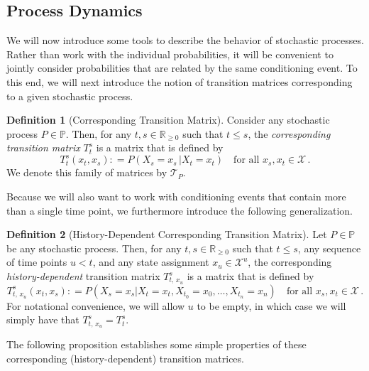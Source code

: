\documentclass[10pt]{paper}
\theoremstyle{definition}
\newtheorem{definition}{Definition}
\newcommand{\reals}{\mathbb{R}}
\newcommand{\realsnonneg}{\reals_{\geq 0}}
\newcommand{\states}{\mathcal{X}}
\newcommand{\processes}{\mathbb{P}}
\newcommand{\coloneqq}{:\!=}
\begin{document}
\subsection{Process Dynamics}\label{sec:dynamics}

We will now introduce some tools to describe the behavior of stochastic processes. Rather than work with the individual probabilities, it will be convenient to jointly consider probabilities that are related by the same conditioning event. To this end, we will next introduce the notion of transition matrices corresponding to a given stochastic process.

\begin{definition}[Corresponding Transition Matrix]\label{def:trans_matrix}
Consider any stochastic process $P\in\processes$. Then, for any $t,s\in\realsnonneg$ such that $t\leq s$, the \emph{corresponding transition matrix} $T_t^s$ is a matrix that is defined by
\begin{equation*}
T_t^s(x_t, x_s) \coloneqq P(X_s=x_s\,\vert X_t=x_t)\quad\text{for all $x_s,x_t\in\states$}\,.
\end{equation*}
We denote this family of matrices by $\mathcal{T}_P$.%
\end{definition}

Because we will also want to work with conditioning events that contain more than a single time point, we furthermore introduce the following generalization.

\begin{definition}[History-Dependent Corresponding Transition Matrix]
Let $P\in\processes$ be any stochastic process. Then, for any $t,s\in\realsnonneg$ such that $t\leq s$, any sequence of time points $u<t$, and any state assignment $x_u\in\states^u$, the corresponding \emph{history-dependent} transition matrix $T_{t,\,x_u}^s$ is a matrix that is defined by
\begin{equation*}
T^s_{t,\,x_u}(x_t,x_s)
\coloneqq
P(X_s=x_s\vert X_t=x_t, X_{t_0}=x_{0}, \dots, X_{t_n}=x_{n})\quad\text{for all $x_s,x_t\in\states$}\,.
\end{equation*}
For notational convenience, we will allow $u$ to be empty, in which case we will simply have that $T_{t,\,x_u}^s=T_t^s$.
\end{definition}

The following proposition establishes some simple properties of these corresponding (history-dependent) transition matrices.
\end{document}

